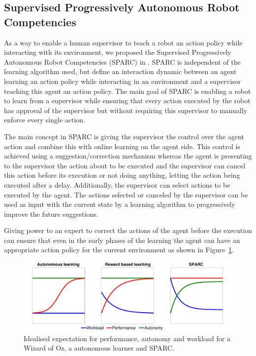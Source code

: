 \documentclass[letterpaper]{article} %
\begin{document}
\subsection{Supervised Progressively Autonomous Robot Competencies}

As a way to enable a human supervisor to teach a robot an action policy while
interacting with its environment, we proposed the Supervised Progressively
Autonomous Robot Competencies (SPARC) in \cite{senft2015sparc}. SPARC is independent
of the learning algorithm used, but define an interaction dynamic between an
agent learning an action policy while interacting in an environment and a
supervisor teaching this agent an action policy. The main goal of SPARC is
enabling a robot to learn from a supervisor while ensuring that every action
executed by the robot has approval of the supervisor but without requiring this
supervisor to manually enforce every single action.

The main concept in SPARC is giving the supervisor the control over the agent
action and combine this with online learning on the agent side. This control is
achieved using a suggestion/correction mechanism whereas the agent is presenting
to the supervisor the action about to be executed and the supervisor can cancel
this action before its execution or not doing anything, letting the action being
executed after a delay. Additionally, the supervisor can select actions to be
executed by the agent. The actions selected or canceled by the supervisor can be
used as input with the current state by a learning algorithm to progressively
improve the future suggestions.

Giving power to an expert to correct the actions of the agent before the
execution can ensure that even in the early phases of the learning the agent can
have an appropriate action policy for the current environment as shown in Figure~\ref{fig:comparison}.

\begin{figure}
    \centering
    \includegraphics[width=0.9\linewidth]{./fig/motivation.pdf}
    \caption{Idealised expectation for performance, autonomy and workload for a
    Wizard of Oz, a autonomous learner and SPARC.}
    \label{fig:comparison}
\end{figure}
\end{document}
